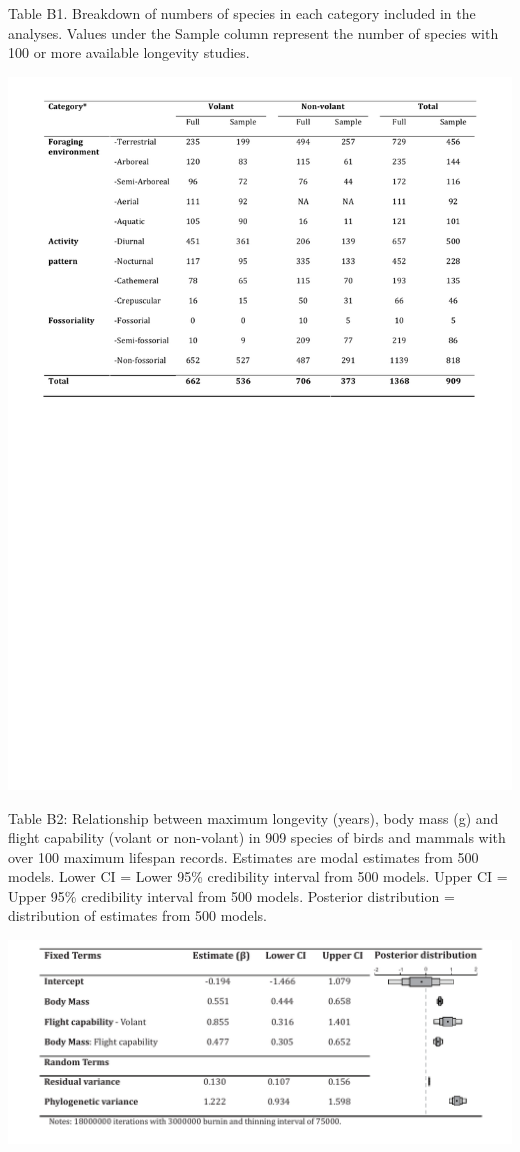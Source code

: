 \begin{table}[!h]
  \caption[ ]{Table B1. Breakdown of numbers of species in each category included in the analyses. Values under the Sample column represent the number of species with 100 or more available longevity studies.}
  \label{tbl:Table B1.}
  \includegraphics[width=\linewidth]{ch3-longevity-appendix/Table_B1.pdf}
\end{table}


\begin{table}[!h]
  \caption[ ]{Table B2: Relationship between maximum longevity (years), body mass (g) and flight capability (volant or non-volant) in 909 species of birds and mammals with over 100 maximum lifespan records. Estimates are modal estimates from 500 models. Lower CI = Lower 95\% credibility interval from 500 models. Upper CI = Upper 95\% credibility interval from 500 models. Posterior distribution = distribution of estimates from 500 models.}
  \label{tbl:Table B2.}
  \includegraphics[width=\linewidth]{ch3-longevity-appendix/Table_B2.pdf}
\end{table}


